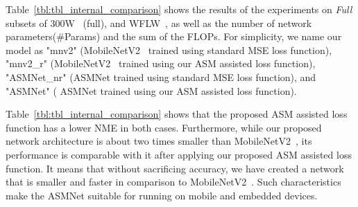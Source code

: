\documentclass[final]{cvpr}
\begin{document}
Table~\ref{tbl:tbl_internal_comparison} shows the results of the experiments on \textit{Full} subsets of 300W~\cite{sagonas2013300} (full), and WFLW~\cite{wu2018look}, as well as the number of network parameters(\#Params) and the sum of the FLOPs. For simplicity, we name our model as "mnv2" (MobileNetV2~\cite{sandler2018mobilenetv2} trained using standard MSE loss function), "mnv2\_{r}" (MobileNetV2~\cite{sandler2018mobilenetv2} trained using our ASM assisted loss function), "ASMNet\_{nr}" (ASMNet trained using standard MSE loss function), and "ASMNet" ( ASMNet trained using our ASM assisted loss function).

Table~\ref{tbl:tbl_internal_comparison} shows that the proposed ASM assisted loss function has a lower NME in both cases. Furthermore, while our proposed network architecture is about two times smaller than MobileNetV2~\cite{sandler2018mobilenetv2}, its performance is comparable with it after applying our proposed ASM assisted loss function. It means that without sacrificing accuracy, we have created a network that is smaller and faster in comparison to MobileNetV2~\cite{sandler2018mobilenetv2}. Such characteristics make the ASMNet suitable for running on mobile and embedded devices.

\begin{table}[b]
\centering
\caption{Number of parameters in million (M) and FLOPs in billion (B), as well as Normalized Mean Error (NME in \%) of landmarks localization on 300W~\cite{sagonas2013300}, and WFLW~\cite{wu2018look} datasets.}
\label{tbl:tbl_internal_comparison}
\end{table}
\end{document}
